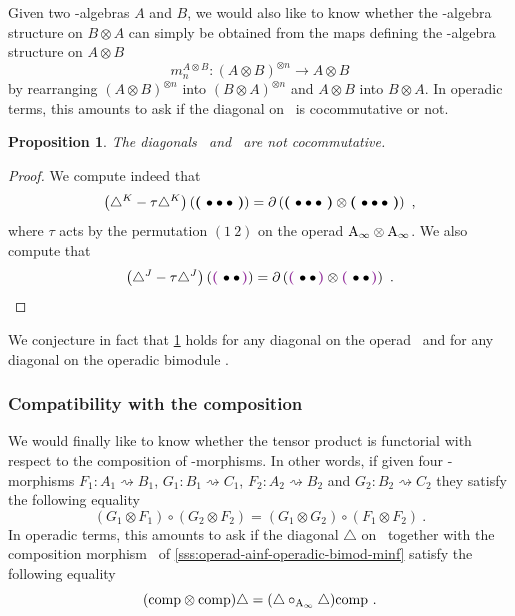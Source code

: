 \documentclass[twoside, 11pt]{amsart}
\newtheorem{proposition}[definition]{Proposition}
\theoremstyle{remark}
\begin{document}
Given two \Ainf -algebras $A$ and $B$, we would also like to know whether the \Ainf -algebra structure on $B \otimes A$ can simply be obtained from the maps defining the \Ainf -algebra structure on $A \otimes B$ \[ m_n^{A \otimes B} : ( A \otimes B)^{\otimes n} \rightarrow A \otimes B \] by rearranging $(A \otimes B)^{\otimes n}$ into $(B \otimes A)^{\otimes n}$ and $A \otimes B$ into $B \otimes A$. In operadic terms, this amounts to ask if the diagonal on \Ainf\ is cocommutative or not. 

\begin{proposition} \label{prop:not-cocomm}
The diagonals \diagainf\ and \diagminf\ are not cocommutative.
\end{proposition} 

\begin{proof}
We compute indeed that
\[ \left( \triangle^{K} - \tau \triangle^{K} \right) \left( \boldsymbol{\left(\right.}  \bullet \bullet \bullet  \boldsymbol{\left.\right)} \right) = \partial \left( \boldsymbol{\left(\right.}  \bullet \bullet \bullet  \boldsymbol{\left.\right)} \otimes \boldsymbol{\left(\right.}  \bullet \bullet \bullet  \boldsymbol{\left.\right)} \right) \ , \]
where $\tau$ acts by the permutation $(1 \ 2)$ on the operad $\mathrm{A}_\infty \otimes \mathrm{A}_\infty$.
We also compute that
\[ \left( \diagminf - \tau \diagminf \right) \left( \purple{\bullet \bullet} \right) = \partial \left( \purple{\bullet \bullet} \otimes \purple{\bullet \bullet} \right) \ . \]
\end{proof}

\noindent We conjecture in fact that \cref{prop:not-cocomm} holds for any diagonal on the operad \Ainf\ and for any diagonal on the operadic bimodule \Minf .
 
\subsubsection{Compatibility with the composition} \label{sss:comp-composition}

We would finally like to know whether the tensor product is functorial with respect to the composition of \Ainf -morphisms. 
In other words, if given four \Ainf -morphisms $F_1 : A_1 \rightsquigarrow B_1$, 
$G_1 : B_1 \rightsquigarrow C_1$, $F_2 : A_2 \rightsquigarrow B_2$ and
$G_2 : B_2 \rightsquigarrow C_2$ they satisfy the following equality
\[ ( G_1 \otimes F_1) \circ (G_2 \otimes F_2) = (G_1 \otimes G_2) \circ (F_1 \otimes F_2) \ . \]
In operadic terms, this amounts to ask if the diagonal $\triangle$ on \Minf\ together with the composition morphism \comp\ of \cref{sss:operad-ainf-operadic-bimod-minf} satisfy the following equality 
\[ ( \mathrm{comp} \otimes \mathrm{comp} ) \triangle = (\triangle \circ_{\mathrm{A}_\infty} \triangle ) \mathrm{comp}   \ . \]
\end{document}
